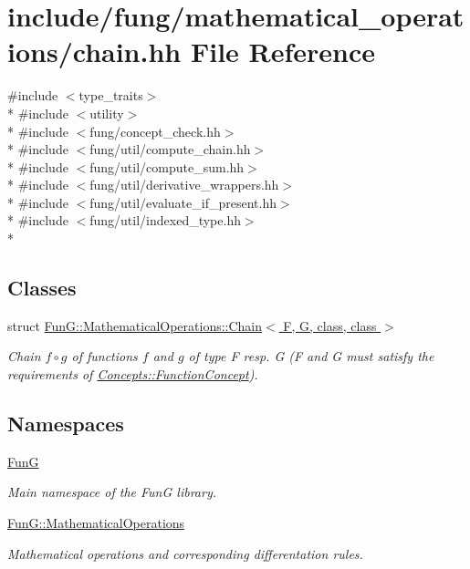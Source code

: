 \hypertarget{chain_8hh}{\section{include/fung/mathematical\-\_\-operations/chain.hh File Reference}
\label{chain_8hh}
}
{\ttfamily \#include $<$type\-\_\-traits$>$}\\*
{\ttfamily \#include $<$utility$>$}\\*
{\ttfamily \#include $<$fung/concept\-\_\-check.\-hh$>$}\\*
{\ttfamily \#include $<$fung/util/compute\-\_\-chain.\-hh$>$}\\*
{\ttfamily \#include $<$fung/util/compute\-\_\-sum.\-hh$>$}\\*
{\ttfamily \#include $<$fung/util/derivative\-\_\-wrappers.\-hh$>$}\\*
{\ttfamily \#include $<$fung/util/evaluate\-\_\-if\-\_\-present.\-hh$>$}\\*
{\ttfamily \#include $<$fung/util/indexed\-\_\-type.\-hh$>$}\\*
\subsection*{Classes}
\begin{DoxyCompactItemize}
\item 
struct \hyperlink{structFunG_1_1MathematicalOperations_1_1Chain}{Fun\-G\-::\-Mathematical\-Operations\-::\-Chain$<$ F, G, class, class $>$}
\begin{DoxyCompactList}\small\item\em Chain $ f\circ g $ of functions $f$ and $g$ of type F resp. G (F and G must satisfy the requirements of \hyperlink{structFunG_1_1Concepts_1_1FunctionConcept}{Concepts\-::\-Function\-Concept}). \end{DoxyCompactList}\end{DoxyCompactItemize}
\subsection*{Namespaces}
\begin{DoxyCompactItemize}
\item 
\hyperlink{namespaceFunG}{Fun\-G}
\begin{DoxyCompactList}\small\item\em Main namespace of the Fun\-G library. \end{DoxyCompactList}\item 
\hyperlink{namespaceFunG_1_1MathematicalOperations}{Fun\-G\-::\-Mathematical\-Operations}
\begin{DoxyCompactList}\small\item\em Mathematical operations and corresponding differentation rules. \end{DoxyCompactList}\end{DoxyCompactItemize}
